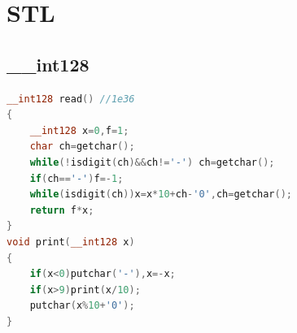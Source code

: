 \documentclass[a4paper]{book}
\begin{document}
\section{STL}
\subsection{\_\_int128}
\begin{lstlisting}[language=c++]
__int128 read() //1e36
{
    __int128 x=0,f=1;
    char ch=getchar();
    while(!isdigit(ch)&&ch!='-') ch=getchar();
    if(ch=='-')f=-1;
    while(isdigit(ch))x=x*10+ch-'0',ch=getchar();
    return f*x;
}
void print(__int128 x)
{
    if(x<0)putchar('-'),x=-x;
    if(x>9)print(x/10); 
    putchar(x%10+'0');
}
\end{lstlisting}
\ifx\allfiles\undefined
\end{document}
